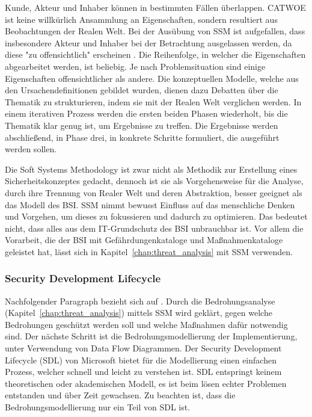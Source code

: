 \documentclass[11pt,a4paper]{report}
\begin{document}
Kunde, Akteur und Inhaber können in bestimmten Fällen überlappen. CATWOE ist keine willkürlich Ansammlung an Eigenschaften, sondern resultiert aus Beobachtungen der Realen Welt. Bei der Ausübung von SSM ist aufgefallen, dass insbesondere Akteur und Inhaber bei der Betrachtung ausgelassen werden, da diese "zu offensichtlich" erscheinen \cite{gutmann7}. Die Reihenfolge, in welcher die Eigenschaften abgearbeitet werden, ist beliebig. Je nach Problemsituation sind einige Eigenschaften offensichtlicher als andere. Die konzeptuellen Modelle, welche aus den Ursachendefinitionen gebildet wurden, dienen dazu Debatten über die Thematik zu strukturieren, indem sie mit der Realen Welt verglichen werden. In einem iterativen Prozess werden die ersten beiden Phasen wiederholt, bis die Thematik klar genug ist, um Ergebnisse zu treffen. Die Ergebnisse werden abschließend, in Phase drei, in konkrete Schritte formuliert, die ausgeführt werden sollen.

Die Soft Systems Methodology ist zwar nicht als Methodik zur Erstellung eines Sicherheitskonzeptes gedacht, dennoch ist sie als Vorgehensweise für die Analyse, durch ihre Trennung von Realer Welt und deren Abstraktion, besser geeignet als das Modell des BSI. SSM nimmt bewusst Einfluss auf das menschliche Denken und Vorgehen, um dieses zu fokussieren und dadurch zu optimieren. Das bedeutet nicht, dass alles aus dem IT-Grundschutz des BSI unbrauchbar ist. Vor allem die Vorarbeit, die der BSI mit Gefährdungenkataloge und Maßnahmenkataloge geleistet hat, lässt sich in Kapitel~\ref{chap:threat_analysis} mit SSM verwenden.

\subsubsection{Security Development Lifecycle}

Nachfolgender Paragraph bezieht sich auf \cite{gutmann10}.
Durch die Bedrohungsanalyse (Kapitel~\ref{chap:threat_analysis}) mittels SSM wird geklärt, gegen welche Bedrohungen geschützt werden soll und welche Maßnahmen dafür notwendig sind. Der nächste Schritt ist die Bedrohungsmodellierung der Implementierung, unter Verwendung von Data Flow Diagrammen. Der Security Development Lifecycle (SDL) von Microsoft bietet für die Modellierung einen einfachen Prozess, welcher schnell und leicht zu verstehen ist. SDL entspringt keinem theoretischen oder akademischen Modell, es ist beim lösen echter Problemen entstanden und über Zeit gewachsen. Zu beachten ist, dass die Bedrohungsmodellierung nur ein Teil von SDL ist. 
\end{document}
